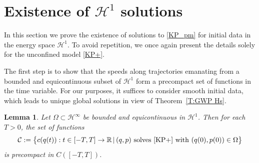 \documentclass{amsart}
\newcommand{\R}{{\mathbb{R}}}
\newtheorem{lemma}[theorem]{Lemma}
\theoremstyle{definition}
\numberwithin{equation}{section}
\renewcommand{\H}{\mathcal H}
\begin{document}
\section{Existence of $\H^1$ solutions}\label{S:6}

In this section we prove the existence of solutions to \eqref{KP_pm} for initial data in the energy space $\H^1$. To avoid repetition, we once again present the details solely for the unconfined model \eqref{KP+}.

The first step is to show that the speeds along trajectories emanating from a bounded and equicontinuous subset of $\H^1$ form a precompact set of functions in the time variable. For our purposes, it suffices to consider smooth initial data, which leads to unique global solutions in view of Theorem~\ref{T:GWP Hs}.

\begin{lemma}\label{L:c equi}
Let $\Omega \subset \H^\infty$ be bounded and equicontinuous in $\H^1$. Then for each $T>0$, the set of functions
\begin{align*}
\mathcal C:=\bigl\{ c(q(t)):t\in [-T,T]\to \R \, |\, \text{$(q,p)$ solves \eqref{KP+} with $(q(0), p(0))\in \Omega$}\bigr\}
\end{align*}
is precompact in $C([-T, T])$.
\end{lemma}
\end{document}
